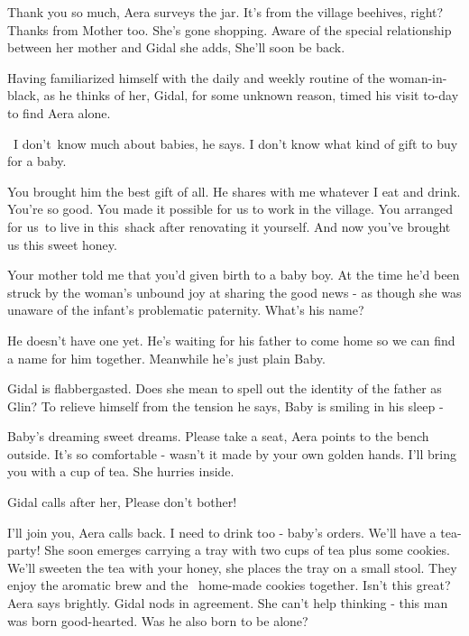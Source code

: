 \documentclass[letterpaper]{article}
\begin{document}
{\textquotedbl}Thank you so much,{\textquotedbl} Aera surveys the jar. {\textquotedbl}It's from the village beehives,
right? Thanks from Mother too. She's gone shopping.{\textquotedbl} Aware of the special relationship between her mother
and Gidal she adds, {\textquotedbl}She'll soon be back.{\textquotedbl} 

Having familiarized himself with the daily and weekly routine of the woman-in-black, as he thinks of her, Gidal, for
some unknown reason, timed his visit to-day to find Aera alone.

\ {\textquotedbl}I don't~know much about babies,{\textquotedbl} he says. {\textquotedbl}I don't know what kind of gift
to buy for a baby.{\textquotedbl} 

{\textquotedbl}You brought him the best gift of all. He shares with me whatever I eat and drink. You're so good. You
made it possible\textcolor[rgb]{0.0,0.4392157,0.7529412}{ }for us to work in the village. You arranged for us~to live
in this~shack after renovating it yourself. And now you've brought us this sweet honey.{\textquotedbl} 

{\textquotedbl}Your mother told me that you'd given\textcolor[rgb]{0.0,0.4392157,0.7529412}{ }birth to a baby
boy.{\textquotedbl} At the time he'd been struck by the woman's unbound joy at sharing the good news - as though she
was unaware of the infant's\textcolor{red}{ }problematic paternity. {\textquotedbl}What's his name?{\textquotedbl}

{\textquotedbl}He doesn't have one yet. He's waiting for his father to come home so we can find a name for him together.
Meanwhile he's just plain Baby.{\textquotedbl} 

Gidal is flabbergasted. Does she mean to spell out the identity of the father as Glin? To relieve himself from the
tension he says, {\textquotedbl}Baby is smiling in his sleep -{\textquotedbl} ~

{\textquotedbl}Baby's dreaming sweet dreams. Please take a seat,{\textquotedbl} Aera points to the bench
outside\textcolor[rgb]{0.0,0.4392157,0.7529412}{.} {\textquotedbl}It's so comfortable - wasn't it made by your own
golden hands. I'll bring you with a cup of tea.{\textquotedbl} She hurries inside. 

Gidal calls after her, {\textquotedbl}Please don't bother!{\textquotedbl} 


\bigskip

{\textquotedbl}I'll join you,{\textquotedbl} Aera calls back. {\textquotedbl}I need to drink too - baby's orders. We'll
have a tea-party!{\textquotedbl} She soon emerges carrying a tray with two cups of tea plus some cookies.
{\textquotedbl}We'll sweeten the tea with your honey,{\textquotedbl}\textcolor[rgb]{0.0,0.4392157,0.7529412}{ }she
places the tray on a small stool. They enjoy the aromatic brew and the \ home-made cookies together.
{\textquotedbl}Isn't this great?{\textquotedbl} Aera says brightly. Gidal nods in agreement. She can't help thinking -
this man was born good-hearted. Was he also born to be alone?
\end{document}
